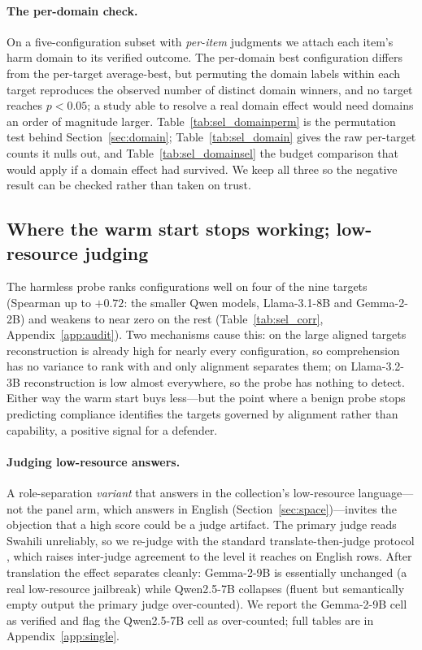 \documentclass{article}
\begin{document}


\paragraph{The per-domain check.} On a five-configuration subset with \emph{per-item} judgments we
attach each item's harm domain to its verified outcome. The per-domain best configuration differs
from the per-target average-best, but permuting the domain labels within each target reproduces the
observed number of distinct domain winners, and no target reaches $p<0.05$; a study able to resolve a
real domain effect would need domains an order of magnitude larger. Table~\ref{tab:sel_domainperm} is
the permutation test behind Section~\ref{sec:domain}; Table~\ref{tab:sel_domain} gives the raw
per-target counts it nulls out, and Table~\ref{tab:sel_domainsel} the budget comparison that would
apply if a domain effect had survived. We keep all three so the negative result can be checked rather
than taken on trust.









\subsection{Where the warm start stops working; low-resource judging}
\label{sec:decoupling}
The harmless probe ranks configurations well on four of the nine targets (Spearman up to $+0.72$: the
smaller Qwen models, Llama-3.1-8B and Gemma-2-2B) and weakens to near zero on the rest
(Table~\ref{tab:sel_corr}, Appendix~\ref{app:audit}). Two mechanisms cause this: on the large aligned
targets reconstruction is already high for nearly every configuration, so comprehension has no
variance to rank with and only alignment separates them; on Llama-3.2-3B reconstruction is low almost
everywhere, so the probe has nothing to detect. Either way the warm start buys less---but the point
where a benign probe stops predicting compliance identifies the targets governed by alignment rather
than capability, a positive signal for a defender.

\paragraph{Judging low-resource answers.}
\label{sec:judge}
A role-separation \emph{variant} that answers in the collection's low-resource language---not the
panel arm, which answers in English (Section~\ref{sec:space})---invites the objection that a high
score could be a judge artifact. The primary judge reads Swahili unreliably, so we re-judge with the
standard translate-then-judge protocol \citep{nllb2022}, which raises inter-judge agreement to the
level it reaches on English rows. After translation the effect separates cleanly: Gemma-2-9B is
essentially unchanged (a real low-resource jailbreak) while Qwen2.5-7B collapses (fluent but
semantically empty output the primary judge over-counted). We report the Gemma-2-9B cell as verified
and flag the Qwen2.5-7B cell as over-counted; full tables are in Appendix~\ref{app:single}.
\end{document}
